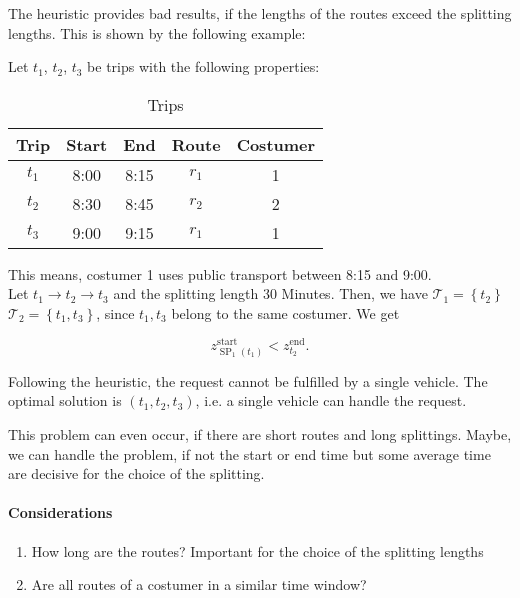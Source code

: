 The heuristic provides bad results, if the lengths of the routes exceed the splitting lengths. This is shown by the following example: \\

\begin{example}

Let $t_1$, $t_2$, $t_3$ be trips with the following properties: \\

\begin{table}[hb]
	\centering
	\begin{tabular}{c|cccc}
		Trip & Start & End & Route & Costumer \\
		\hline
		$t_1$ & 8:00 & 8:15 & $r_1$ & 1 \\
		$t_2$ & 8:30 & 8:45 & $r_2$ & 2 \\
		$t_3$ & 9:00 & 9:15 & $r_1$ & 1 \\
	\end{tabular}
	\caption{Trips}
\end{table}

This means, costumer 1 uses public transport between 8:15 and 9:00. \\

Let $t_1\to t_2\to t_3$ and the splitting length 30 Minutes. Then, we have $\mathcal{T}_1=\left\{t_2\right\}$ $\mathcal{T}_2=\left\{t_1, t_3\right\}$, since $t_1,t_3$ belong to the same costumer. We get 

\begin{equation*}
	z_{\operatorname{SP}_1\left(t_1\right)}^{\operatorname{start}} < z_{t_2}^{\operatorname{end}}.
\end{equation*}

Following the heuristic, the request cannot be fulfilled by a single vehicle. The optimal solution is $\left(t_1,t_2,t_3\right)$, i.e. a single vehicle can handle the request.

\end{example}

This problem can even occur, if there are short routes and long splittings. Maybe, we can handle the problem, if not the start or end time but some average time are decisive for the choice of the splitting.

\paragraph{Considerations}

\begin{enumerate}
	\item{How long are the routes? Important for the choice of the splitting lengths}
	\item{Are all routes of a costumer in a similar time window?}
\end{enumerate}


